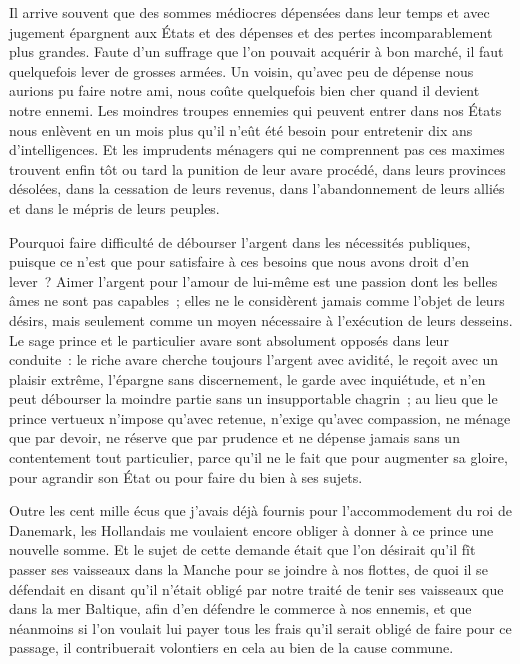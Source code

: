 \documentclass[french,twoside]{book} %
\begin{document}
Il arrive souvent que des sommes médiocres dépensées dans leur temps et avec jugement épargnent aux États et des dépenses et des pertes incomparablement plus grandes. Faute d’un suffrage que l’on pouvait acquérir à bon marché, il faut quelquefois lever de grosses armées. Un voisin, qu’avec peu de dépense nous aurions pu faire notre ami, nous coûte quelquefois bien cher quand il devient notre ennemi. Les moindres troupes ennemies qui peuvent entrer dans nos États nous enlèvent en un mois plus qu’il n’eût été besoin pour entretenir dix ans d’intelligences. Et les imprudents ménagers qui ne comprennent pas ces maximes trouvent enfin tôt ou tard la punition de leur avare procédé, dans leurs provinces désolées, dans la cessation de leurs revenus, dans l’abandonnement de leurs alliés et dans le mépris de leurs peuples.\par
Pourquoi faire difficulté de débourser l’argent dans les nécessités publiques, puisque ce n’est que pour satisfaire à ces besoins que nous avons droit d’en lever ? Aimer l’argent pour l’amour de lui-même est une passion dont les belles âmes ne sont pas capables ; elles ne le considèrent jamais comme l’objet de leurs désirs, mais seulement comme un moyen nécessaire à l’exécution de leurs desseins. Le sage prince et le particulier avare sont absolument opposés dans leur conduite : le riche avare cherche toujours l’argent avec avidité, le reçoit avec un plaisir extrême, l’épargne sans discernement, le garde avec inquiétude, et n’en peut débourser la moindre partie sans un insupportable chagrin ; au lieu que le prince vertueux n’impose qu’avec retenue, n’exige qu’avec compassion, ne ménage que par devoir, ne réserve que par prudence et ne dépense jamais sans un contentement tout particulier, parce qu’il ne le fait que pour augmenter sa gloire, pour agrandir son État ou pour faire du bien à ses sujets.\par
Outre les cent mille écus que j’avais déjà fournis pour l’accommodement du roi de Danemark, les Hollandais me voulaient encore obliger à donner à ce prince une nouvelle somme. Et le sujet de cette demande était que l’on désirait qu’il fît passer ses vaisseaux dans la Manche pour se joindre à nos flottes, de quoi il se défendait en disant qu’il n’était obligé par notre traité de tenir ses vaisseaux que dans la mer Baltique, afin d’en défendre le commerce à nos ennemis, et que néanmoins si l’on voulait lui payer tous les frais qu’il serait obligé de faire pour ce passage, il contribuerait volontiers en cela au bien de la cause commune.\par
\end{document}

